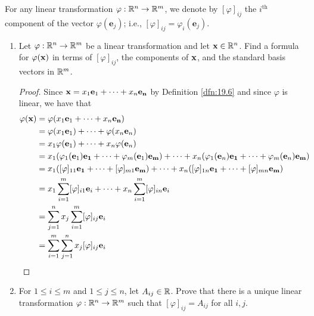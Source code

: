 \documentclass[../main.tex]{subfiles}
\begin{document}
\begin{definition}\label{dfn:19.7}
    For any linear transformation $\varphi:\mathbb{R}^n\to\mathbb{R}^m$, we denote by $[\varphi]_{ij}$ the $i^\text{th}$ component of the vector $\varphi(\mathbf{e}_j)$; i.e., $[\varphi]_{ij}=\varphi_i(\mathbf{e}_j)$.
\end{definition}

\begin{exercise}\label{exr:19.8}\leavevmode
    \begin{enumerate}[label={(\alph*)},ref={\theexercise\alph*}]
        \item \label{exr:19.8a}Let $\varphi:\mathbb{R}^n\to\mathbb{R}^m$ be a linear transformation and let $\mathbf{x}\in\mathbb{R}^n$. Find a formula for $\varphi(\mathbf{x})$ in terms of $[\varphi]_{ij}$, the components of $\mathbf{x}$, and the standard basis vectors in $\mathbb{R}^m$.
        \begin{proof}
            Since $\mathbf{x}=x_1\mathbf{e}_1+\cdots+x_n\mathbf{e_n}$ by Definition \ref{dfn:19.6} and since $\varphi$ is linear, we have that
            \begingroup
            \allowdisplaybreaks
            \begin{align*}
                \varphi(\mathbf{x}) &= \varphi(x_1\mathbf{e}_1+\cdots+x_n\mathbf{e_n})\\
                &= \varphi(x_1\mathbf{e}_1)+\cdots+\varphi(x_n\mathbf{e}_n)\\
                &= x_1\varphi(\mathbf{e}_1)+\cdots+x_n\varphi(\mathbf{e}_n)\\
                &= x_1(\varphi_1(\mathbf{e}_1)\mathbf{e_1}+\cdots+\varphi_m(\mathbf{e}_1)\mathbf{e_m})+\cdots+x_n(\varphi_1(\mathbf{e}_n)\mathbf{e_1}+\cdots+\varphi_m(\mathbf{e}_n)\mathbf{e_m})\\
                &= x_1([\varphi]_{11}\mathbf{e_1}+\cdots+[\varphi]_{m1}\mathbf{e_m})+\cdots+x_n([\varphi]_{1n}\mathbf{e_1}+\cdots+[\varphi]_{mn}\mathbf{e_m})\\
                &= x_1\sum_{i=1}^m[\varphi]_{i1}\mathbf{e}_i+\cdots+x_n\sum_{i=1}^m[\varphi]_{in}\mathbf{e}_i\\
                &= \sum_{j=1}^nx_j\sum_{i=1}^m[\varphi]_{ij}\mathbf{e}_i\\
                &= \sum_{i=1}^m\sum_{j=1}^nx_j[\varphi]_{ij}\mathbf{e}_i
            \end{align*}
            \endgroup
        \end{proof}
        \item \label{exr:19.8b}For $1\leq i\leq m$ and $1\leq j\leq n$, let $A_{ij}\in\mathbb{R}$. Prove that there is a unique linear transformation $\varphi:\mathbb{R}^n\to\mathbb{R}^m$ such that $[\varphi]_{ij}=A_{ij}$ for all $i,j$.

\end{enumerate}
\end{exercise}
\end{document}
